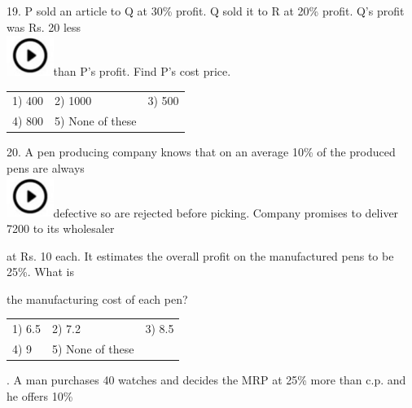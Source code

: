 \documentclass{article}
\begin{document}
	19. P sold an article to Q at 30\% profit. Q sold it to R at 20\% profit. Q's profit was Rs. 20    less \noindent \\ \includegraphics*[width=0.60in, height=0.52in]{images/image1}than P's profit. Find P's cost price.
	
	\noindent  
	\begin{tabular}{p{1.7in} p{1.6in} p{1.6in}} \\ 
 1) 400                      & 2) 1000             & 3) 500               \\
4) 800               & 5) None of these  \\
\end{tabular}
	
	\noindent 
	
	20. A pen producing company knows that on an average 10\% of the produced pens are always \noindent \\ \includegraphics*[width=0.60in, height=0.52in]{images/image1}defective so are rejected before picking. Company promises to deliver 7200 to its wholesaler
	
	\noindent at Rs. 10 each. It estimates the overall profit on the manufactured pens to be 25\%. What is
	
	\noindent 
	
	\noindent the manufacturing cost of each pen?
	
	\noindent 
	
	\noindent  
	\begin{tabular}{p{1.7in} p{1.6in} p{1.6in}} \\ 
 1) 6.5                       & 2) 7.2                & 3) 8.5                \\
4) 9                   & 5) None of these  \\
\end{tabular}
	
	\noindent 
	
	\noindent 
	
	\noindent 
	
	. A man purchases 40 watches and decides the MRP at 25\% more than c.p. and he offers 10\%
	
\end{document}
